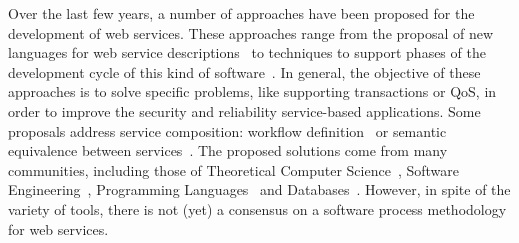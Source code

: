 Over the last few years, a number of approaches have been proposed for the
development of web services. These approaches range from the proposal of new languages for web service
descriptions~\cite{bpel03, MPC08, wscl02, Martin04,SBS04} to techniques to
support phases of the development cycle of this kind of
software~\cite{lipari2007,BianculliGSBG07}. In general, the objective of these
approaches is to solve specific problems, like supporting transactions or
QoS, in order to improve the security and reliability service-based
applications. Some proposals address service composition: workflow
definition~\cite{AalstHKB03,MuP06} or semantic equivalence between
services~\cite{BHM06}. The proposed solutions come from many communities, including those of Theoretical Computer Science~\cite{SBS04,VA05,HamadiB03,AlH01,GGP08}, Software
Engineering~\cite{burdy:05,AalstHKB03,Aal03,choreoWG,MendesPDB09}, Programming
Languages~\cite{MPC08,bpel03} and Databases~\cite{PiresBM02,ABM01}.
However, in spite of the variety of tools, there is not (yet) a consensus on a software
process methodology for web services. 




